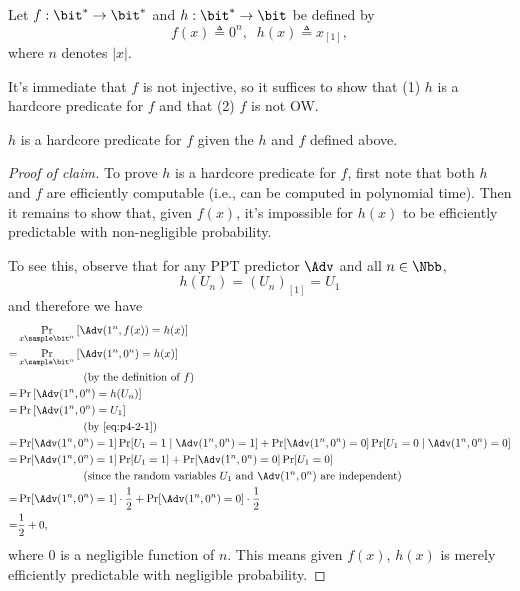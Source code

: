\begin{answer}[ii]

Let $f:\bit^\ast\to \bit^\ast$ and $h:\bit^\ast\to \bit$ be defined by
\[
    f(x)\triangleq 0^n,\;\; h(x)\triangleq x_{[1]},
\]
where $n$ denotes $|x|$.

It's immediate that $f$ is not injective, so it suffices to show that (1) $h$ is a hardcore predicate for $f$ and that (2) $f$ is not OW.

\begin{claim}
    $h$ is a hardcore predicate for $f$ given the $h$ and $f$ defined above.
\end{claim}
\begin{proof}[Proof of claim]
    To prove $h$ is a hardcore predicate for $f$, first note that both $h$ and $f$ are efficiently computable (i.e., can be computed in polynomial time). Then it remains to show that, given $f(x)$, it's impossible for $h(x)$ to be efficiently predictable with non-negligible probability. 
    
    To see this, observe that for any PPT predictor $\Adv$ and all $n\in\Nbb$,
    \begin{equation}\label{eq:p4-2-1}
        h(U_n) = (U_n)_{[1]} = U_1
    \end{equation}
    and therefore we have
    \begin{align*}
        &\Pr_{x\sample \bit^n}\left[ \Adv(1^n, f(x))= h(x) \right] \\
        =& \Pr_{x\sample \bit^n}\left[ \Adv(1^n, 0^n)= h(x) \right] \\
        &\qquad\qquad\qquad \textrm{(by the definition of $f$)}\\
        =& \Pr\left[ \Adv(1^n, 0^n)= h(U_n) \right] \\
        =& \Pr\left[ \Adv(1^n, 0^n)= U_1 \right] \\
        &\qquad\qquad\qquad \textrm{(by \eqref{eq:p4-2-1})}\\
        =& \Pr[\Adv(1^n, 0^n)=1]\Pr[U_1=1 \mid \Adv(1^n, 0^n)=1] + \Pr[\Adv(1^n, 0^n)=0]\Pr[U_1=0 \mid \Adv(1^n, 0^n)=0]\\
        =& \Pr[\Adv(1^n, 0^n)=1]\Pr[U_1=1] + \Pr[\Adv(1^n, 0^n)=0]\Pr[U_1=0] \\
        &\qquad\qquad\qquad \textrm{(since the random variables $U_1$ and $\Adv(1^n, 0^n)$ are independent)} \\
        =& \Pr[\Adv(1^n, 0^n)=1]\cdot \frac{1}{2}+\Pr[\Adv(1^n, 0^n)=0]\cdot \frac{1}{2}\\
        =& \frac{1}{2} + 0,
    \end{align*}
    where $0$ is a negligible function of $n$. This means given $f(x)$, $h(x)$ is merely efficiently predictable with negligible probability. 
    

\end{proof}
\end{answer}
